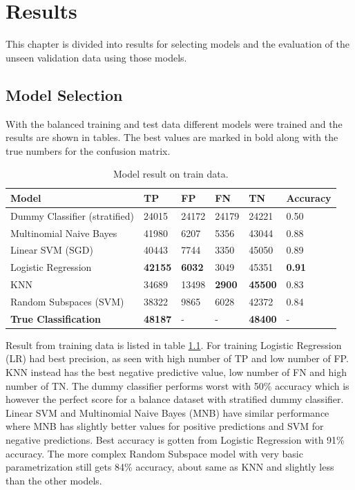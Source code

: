 \chapter{Results}
\label{cha:results}

This chapter is divided into results for selecting models and the evaluation of the unseen validation data using those models. 


\section{Model Selection}
\label{sec:model-selection-result}

With the balanced training and test data different models were trained and the results are shown in tables. 
The best values are marked in bold along with the true numbers for the confusion matrix. 


\begin{table}[H]
    \centering
    \caption{Model result on train data.}
    \label{tab:train-table}
    \begin{tabular}{@{}llllll@{}}
    \toprule
    Model                         & TP             & FP            & FN            & TN             & Accuracy      \\ \midrule
    Dummy Classifier (stratified) & 24015          & 24172         & 24179         & 24221          & 0.50          \\
    Multinomial Naive Bayes       & 41980          & 6207          & 5356          & 43044          & 0.88          \\
    Linear SVM (SGD)              & 40443          & 7744          & 3350          & 45050          & 0.89          \\
    Logistic Regression           & \textbf{42155} & \textbf{6032} & 3049          & 45351          & \textbf{0.91} \\
    KNN                           & 34689          & 13498         & \textbf{2900} & \textbf{45500} & 0.83          \\
    Random Subspaces (SVM)        & 38322          & 9865          & 6028          & 42372          & 0.84          \\ \midrule
    \textbf{True Classification}  & \textbf{48187} & -    & -    & \textbf{48400} & -    
    \end{tabular}
\end{table}


Result from training data is listed in table \ref{tab:train-table}. 
For training Logistic Regression (LR) had best precision, as seen with high number of TP and low number of FP. 
KNN instead has the best negative predictive value, low number of FN and high number of TN. 
The dummy classifier performs worst with 50\% accuracy which is however the perfect score for a balance dataset with stratified dummy classifier. 
Linear SVM and Multinomial Naive Bayes (MNB) have similar performance where MNB has slightly better values for positive predictions and SVM for negative predictions. 
Best accuracy is gotten from Logistic Regression with 91\% accuracy. 
The more complex Random Subspace model with very basic parametrization still gets 84\% accuracy, about same as KNN and slightly less than the other models.


